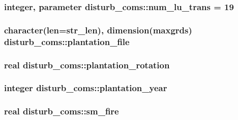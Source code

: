 \subsubsection[{num\+\_\+lu\+\_\+trans}]{\setlength{\rightskip}{0pt plus 5cm}integer, parameter disturb\+\_\+coms\+::num\+\_\+lu\+\_\+trans = 19}\label{namespacedisturb__coms_ac39535da2e75c569a86d8f91379d75d9}
\hypertarget{namespacedisturb__coms_ac1b7ac7c81566618705267bc595476bf}{}
\subsubsection[{plantation\+\_\+file}]{\setlength{\rightskip}{0pt plus 5cm}character(len=str\+\_\+len), dimension(maxgrds) disturb\+\_\+coms\+::plantation\+\_\+file}\label{namespacedisturb__coms_ac1b7ac7c81566618705267bc595476bf}
\hypertarget{namespacedisturb__coms_a376a3a991d013bb7fc01f11392b85e71}{}
\subsubsection[{plantation\+\_\+rotation}]{\setlength{\rightskip}{0pt plus 5cm}real disturb\+\_\+coms\+::plantation\+\_\+rotation}\label{namespacedisturb__coms_a376a3a991d013bb7fc01f11392b85e71}
\hypertarget{namespacedisturb__coms_af5965ee4c60a64646fdce9039c4e8aa8}{}
\subsubsection[{plantation\+\_\+year}]{\setlength{\rightskip}{0pt plus 5cm}integer disturb\+\_\+coms\+::plantation\+\_\+year}\label{namespacedisturb__coms_af5965ee4c60a64646fdce9039c4e8aa8}
\hypertarget{namespacedisturb__coms_a78e160b31b155e0e0dbddbe1c6614c1c}{}
\subsubsection[{sm\+\_\+fire}]{\setlength{\rightskip}{0pt plus 5cm}real disturb\+\_\+coms\+::sm\+\_\+fire}\label{namespacedisturb__coms_a78e160b31b155e0e0dbddbe1c6614c1c}
\hypertarget{namespacedisturb__coms_abbe69bdb8568232491820307dfa0e8a2}{}
